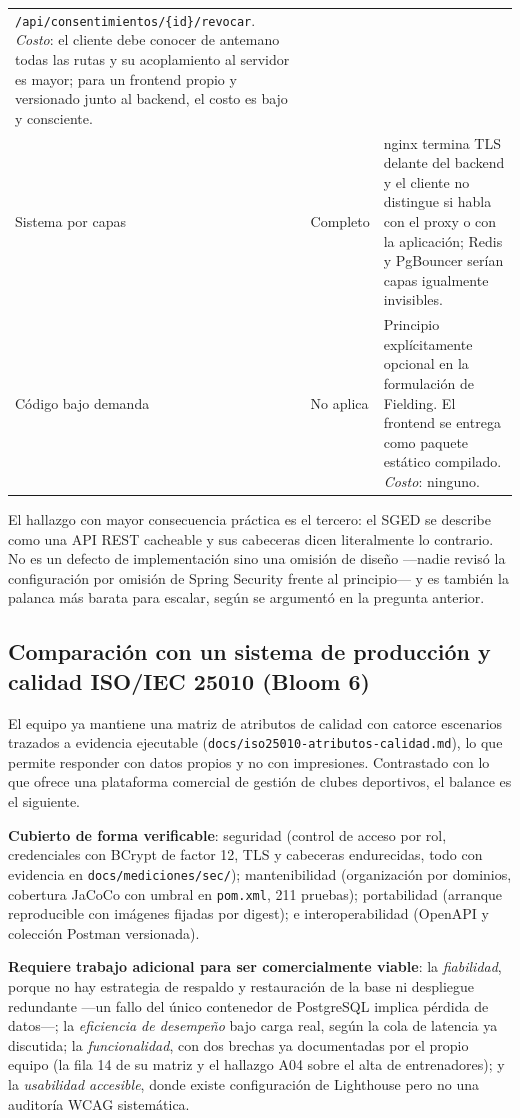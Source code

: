 \documentclass[12pt,a4paper]{article}
\begin{document}
\begin{table}[h!]
\begin{tabularx}{\linewidth}{@{}L{2.9cm}L{1.9cm}L{8.6cm}@{}}
      \texttt{/api/consentimientos/\{id\}/revocar}. \textit{Costo}: el cliente debe conocer de
      antemano todas las rutas y su acoplamiento al servidor es mayor; para un frontend propio y
      versionado junto al backend, el costo es bajo y consciente. \\[3pt]
    Sistema por capas & Completo &
      nginx termina TLS delante del backend y el cliente no distingue si habla con el proxy o con
      la aplicación; Redis y PgBouncer serían capas igualmente invisibles. \\[3pt]
    Código bajo demanda & No aplica &
      Principio explícitamente opcional en la formulación de Fielding. El frontend se entrega
      como paquete estático compilado. \textit{Costo}: ninguno. \\
    \bottomrule
  \end{tabularx}
\end{table}

El hallazgo con mayor consecuencia práctica es el tercero: el SGED se describe como una API REST
cacheable y sus cabeceras dicen literalmente lo contrario. No es un defecto de implementación
sino una omisión de diseño ---nadie revisó la configuración por omisión de Spring Security frente
al principio--- y es también la palanca más barata para escalar, según se argumentó en la
pregunta anterior.

\subsection{Comparación con un sistema de producción y calidad ISO/IEC 25010 (Bloom 6)}

El equipo ya mantiene una matriz de atributos de calidad con catorce escenarios trazados a
evidencia ejecutable (\texttt{docs/iso25010-atributos-calidad.md}), lo que permite responder con
datos propios y no con impresiones. Contrastado con lo que ofrece una plataforma comercial de
gestión de clubes deportivos, el balance es el siguiente.

\textbf{Cubierto de forma verificable}: seguridad (control de acceso por rol, credenciales con
BCrypt de factor 12, TLS y cabeceras endurecidas, todo con evidencia en
\texttt{docs/mediciones/sec/}); mantenibilidad (organización por dominios, cobertura JaCoCo con
umbral en \texttt{pom.xml}, 211 pruebas); portabilidad (arranque reproducible con imágenes
fijadas por digest); e interoperabilidad (OpenAPI y colección Postman versionada).

\textbf{Requiere trabajo adicional para ser comercialmente viable}: la \textit{fiabilidad},
porque no hay estrategia de respaldo y restauración de la base ni despliegue redundante ---un
fallo del único contenedor de PostgreSQL implica pérdida de datos---; la
\textit{eficiencia de desempeño} bajo carga real, según la cola de latencia ya discutida; la
\textit{funcionalidad}, con dos brechas ya documentadas por el propio equipo (la fila 14 de su
matriz y el hallazgo A04 sobre el alta de entrenadores); y la \textit{usabilidad accesible},
donde existe configuración de Lighthouse pero no una auditoría WCAG sistemática.
\end{document}
